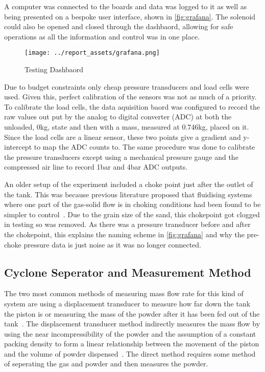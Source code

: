 A computer was connected to the boards and data was logged to it as well as being presented on a bespoke user interface, shown in \autoref{fig:grafana}. The solenoid could also be opened and closed through the dashbaord, allowing for safe operations as all the information and control was in one place.
\begin{figure}[htbp]
    \centering

    \begin{minipage}{0.95\textwidth}
        \centering
        \texttt{[image: ../report\_assets/grafana.png]}
        \caption{Testing Dashbaord}\label{fig:grafana}
    \end{minipage}

\end{figure}
Due to budget constraints only cheap pressure transducers and load cells were used. Given this, perfect calibration of the sensors was not as much of a priority. To calibrate the load cells, the data aquisition baord was configured to record the raw values out put by the analog to digital converter (ADC) at both the unloaded, 0kg, state and then with a mass, measured at 0.746kg, placed on it. Since the load cells are a linear sensor, these two points give a gradient and y-intercept to map the ADC counts to. The same procedure was done to calibrate the pressure transducers except using a mechanical pressure gauge and the compressed air line to record 1bar and 4bar ADC outputs.

An older setup of the experiment included a choke point just after the outlet of the tank. This was because previous literature proposed that fluidising systems where one part of the gas-solid flow is in choking conditions had been found to be simpler to control~\cite{SUN201630}. Due to the grain size of the sand, this chokepoint got clogged in testing so was removed. As there was a pressure transducer before and after the chokepoint, this explains the naming scheme in \autoref{fig:grafana} and why the pre-choke pressure data is just noise as it was no longer connected.

\subsection{Cyclone Seperator and Measurement Method}
The two most common methods of measuring mass flow rate for this kind of system are using a displacement transducer to measure how far down the tank the piston is or measuring the mass of the powder after it has been fed out of the tank~\cite{SUN201630}\cite{LI2021712}\cite{Tang22}.
 The displacement transducer method indirectly measures the mass flow by using the near incompressibility of the powder and the assumption of a constant packing density to form a linear relationship between the movement of the piston and the volume of powder dispensed~\cite{SUN201630}. The direct method requires some method of seperating the gas and powder and then measures the powder. 

